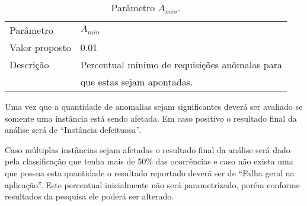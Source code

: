 \begin{table}[H]
\caption{Parâmetro $A_{min}$.}
\vspace{0.25cm}
\begin{tabular}{ll}
Parâmetro      & $A_{min}$ \\
Valor proposto & 0.01 \\
Descrição      & Percentual mínimo de requisições anômalas para \\
               & que estas sejam apontadas.
\end{tabular}
\end{table}

Uma vez que a quantidade de anomalias sejam significantes deverá ser avaliado se
somente uma instância está sendo afetada. Em caso positivo o resultado final da
análise será de ``Instância defeituosa''.

Caso múltiplas instâncias sejam afetadas o resultado final da análise será dado
pela classificação que tenha mais de 50\% das ocorrências e caso não exista uma
que possua esta quantidade o resultado reportado deverá ser de ``Falha geral na
aplicação''. Este percentual inicialmente não será parametrizado, porém conforme
resultados da pesquisa ele poderá ser alterado.
